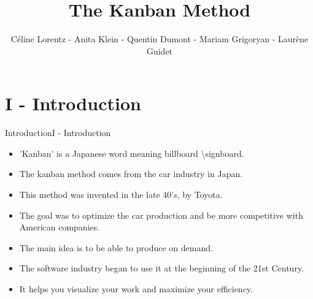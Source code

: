 \documentclass[10pt]{beamer}
\author{Céline Lorentz - Anita Klein - Quentin Dumont - Mariam Grigoryan - Laurène Guidet}
\title{The Kanban Method}
\newcommand{\PI}{I - Introduction}
\begin{document}
    
\begin{frame}

    \maketitle

\end{frame}
\section{\PI} 
\begin{frame}{Introduction}{\PI} 
    \begin{itemize}
        \item 'Kanban' is a Japanese word meaning billboard \textbackslash signboard. 
        \item The kanban method comes from the car industry in Japan.
        \item This method was invented in the late 40's, by Toyota.
        \item The goal was to optimize the car production and be more competitive with American companies.
        \item The main idea is to be able to produce on demand.
        \item The software industry began to use it at the beginning of the 21st Century.
        \item It helps you visualize your work and maximize your efficiency.
    \end{itemize}  

\end{frame}
\end{document}
